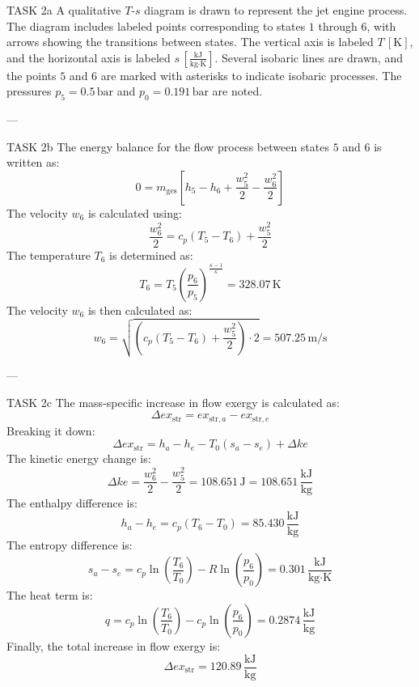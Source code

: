 TASK 2a  
A qualitative \( T \)-\( s \) diagram is drawn to represent the jet engine process. The diagram includes labeled points corresponding to states \( 1 \) through \( 6 \), with arrows showing the transitions between states. The vertical axis is labeled \( T \, [\text{K}] \), and the horizontal axis is labeled \( s \, [\frac{\text{kJ}}{\text{kg·K}}] \). Several isobaric lines are drawn, and the points \( 5 \) and \( 6 \) are marked with asterisks to indicate isobaric processes. The pressures \( p_5 = 0.5 \, \text{bar} \) and \( p_0 = 0.191 \, \text{bar} \) are noted.

---

TASK 2b  
The energy balance for the flow process between states \( 5 \) and \( 6 \) is written as:  
\[
0 = m_{\text{ges}} \left[ h_5 - h_6 + \frac{w_5^2}{2} - \frac{w_6^2}{2} \right]
\]  
The velocity \( w_6 \) is calculated using:  
\[
\frac{w_6^2}{2} = c_p \left( T_5 - T_6 \right) + \frac{w_5^2}{2}
\]  
The temperature \( T_6 \) is determined as:  
\[
T_6 = T_5 \left( \frac{p_6}{p_5} \right)^{\frac{\kappa - 1}{\kappa}} = 328.07 \, \text{K}
\]  
The velocity \( w_6 \) is then calculated as:  
\[
w_6 = \sqrt{ \left( c_p \left( T_5 - T_6 \right) + \frac{w_5^2}{2} \right) \cdot 2 } = 507.25 \, \text{m/s}
\]

---

TASK 2c  
The mass-specific increase in flow exergy is calculated as:  
\[
\Delta ex_{\text{str}} = ex_{\text{str},a} - ex_{\text{str},e}
\]  
Breaking it down:  
\[
\Delta ex_{\text{str}} = h_a - h_e - T_0 \left( s_a - s_e \right) + \Delta ke
\]  
The kinetic energy change is:  
\[
\Delta ke = \frac{w_6^2}{2} - \frac{w_5^2}{2} = 108.651 \, \text{J} = 108.651 \, \frac{\text{kJ}}{\text{kg}}
\]  
The enthalpy difference is:  
\[
h_a - h_e = c_p \left( T_6 - T_0 \right) = 85.430 \, \frac{\text{kJ}}{\text{kg}}
\]  
The entropy difference is:  
\[
s_a - s_e = c_p \ln \left( \frac{T_6}{T_0} \right) - R \ln \left( \frac{p_6}{p_0} \right) = 0.301 \, \frac{\text{kJ}}{\text{kg·K}}
\]  
The heat term is:  
\[
q = c_p \ln \left( \frac{T_6}{T_0} \right) - c_p \ln \left( \frac{p_6}{p_0} \right) = 0.2874 \, \frac{\text{kJ}}{\text{kg}}
\]  
Finally, the total increase in flow exergy is:  
\[
\Delta ex_{\text{str}} = 120.89 \, \frac{\text{kJ}}{\text{kg}}
\]